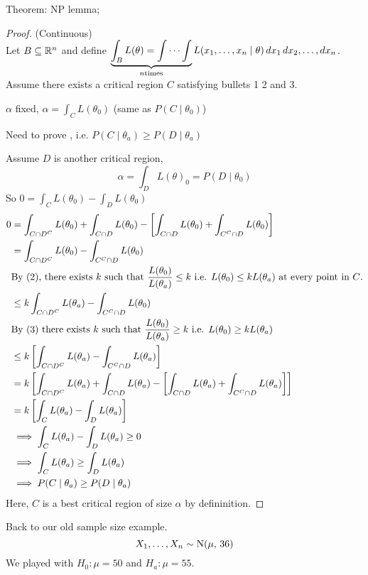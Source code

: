Theorem: NP lemma;
\begin{proof} (Continuous)\\
    Let $B \subseteq \mathbb{R}^n$ and define $\displaystyle \underbrace{\int_B L(\theta) = \int \cdots \int}_{n \text{times}} L({x}_1, \dots, {x}_n \mid \theta) \, dx_1\, dx_2, \dots, dx_n  $.\\
    Assume there exists a critical region $C$ satisfying bullets 1 2 and 3.

    \nl $\alpha$ fixed, $\alpha = \int_C L(\theta_0)$ (same as $P(C \mid \theta_0)$)

    \nl Need to prove , i.e. $P(C \mid \theta_a) \geq P(D \mid \theta_a)$

    \nl Assume $D$ is another critical region,
    $$\alpha = \int_D L(\theta)_0 = P(D\mid \theta_0)$$
    So $\displaystyle 0 = \int_C L(\theta_0) - \int_D L(\theta_0) $
    \begin{align*}0 &= \int_{C \cap D^C} L(\theta_0) + \int_{C \cap D} L(\theta_0) - \brac{ \int_{C \cap D} L(\theta_0) + \int_{C^C \cap D} L(\theta_0) }\\
        &= \int_{C \cap D^C} L(\theta_0) - \int_{C^C \cap D} L(\theta_0)\\
    &\text{By (2), there exists $k$ such that $\dfrac{L(\theta_0)}{L(\theta_a)} \leq k$ i.e. $L(\theta_0) \leq kL(\theta_a)$ at every point in $C$.}\\
    & \leq k \int_{C \cap D^C} L(\theta_a) - \int_{C^C \cap D} L(\theta_0)\\
    &\text{By (3) there exists $k$ such that $\dfrac{L(\theta_0)}{L(\theta_a)} \geq k$ i.e.  $L(\theta_0) \geq kL(\theta_a)$}\\
    & \leq k \brac{\int_{C \cap D^C} L(\theta_a) - \int_{C^C \cap D} L(\theta_a)}\\
    &= k \brac{\int_{C \cap D^C} L(\theta_a) + \int_{C \cap D} L(\theta_a) - \brac{ \int_{C \cap D} L(\theta_a) + \int_{C^C \cap D} L(\theta_a) }}\\
    &= k \brac{\int_C L(\theta_a) - \int_D L(\theta_a)}\\
    & \implies \int_C L(\theta_a) - \int_D L(\theta_a) \geq 0\\
    & \implies \int_C L(\theta_a) \geq \int_D L(\theta_a)\\
    & \implies P(C \mid \theta_a) \geq P(D \mid \theta_a)
    \end{align*}
    Here, $C$ is a best critical region of size $\alpha$ by defininition.
\end{proof}
\example Back to our old sample size example. 
$${X}_1, \dots, {X}_n \sim \operatorname{N}(\mu,\,36)$$
We played with $H_0 : \mu = 50$ and $H_a : \mu = 55$. 

